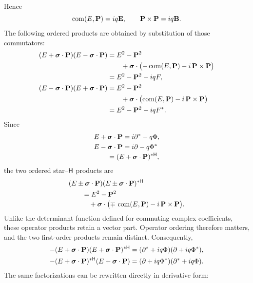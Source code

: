 Hence
\begin{equation*}
\operatorname{com}\!\left(E,\mathbf{P}\right)=iq\mathbf{E},
\qquad
\mathbf{P}\times\mathbf{P}=iq\mathbf{B}.
\end{equation*}
The following ordered products are obtained by substitution of those commutators:
\begin{align*}
(E+\mathbf{\bm{\sigma}}\cdot\mathbf{P})(E-\mathbf{\bm{\sigma}}\cdot\mathbf{P})
&=E^2-\mathbf{P}^2\notag\\
&\qquad+\mathbf{\bm{\sigma}}\cdot\bigl(-\operatorname{com}\!\left(E,\mathbf{P}\right)-i\,\mathbf{P}\times\mathbf{P}\bigr)\notag\\
&=E^2-\mathbf{P}^2-iqF,\\
(E-\mathbf{\bm{\sigma}}\cdot\mathbf{P})(E+\mathbf{\bm{\sigma}}\cdot\mathbf{P})
&=E^2-\mathbf{P}^2\notag\\
&\qquad+\mathbf{\bm{\sigma}}\cdot\bigl(\operatorname{com}\!\left(E,\mathbf{P}\right)-i\,\mathbf{P}\times\mathbf{P}\bigr)\notag\\
&=E^2-\mathbf{P}^2-iqF^{*}.
\end{align*}
Since
\begin{equation*}
\begin{aligned}
&E+\mathbf{\bm{\sigma}}\cdot\mathbf{P}
=i\partial^{*}-q\Phi,\\
&E-\mathbf{\bm{\sigma}}\cdot\mathbf{P}
=i\partial-q\Phi^{*}\\[-0.2em]
&\qquad=(E+\mathbf{\bm{\sigma}}\cdot\mathbf{P})^{*\mathsf H},
\end{aligned}
\end{equation*}
the two ordered star--\(\mathsf H\) products are
\begin{equation*}
\begin{aligned}
&(E\pm\mathbf{\bm{\sigma}}\cdot\mathbf{P})
(E\pm\mathbf{\bm{\sigma}}\cdot\mathbf{P})^{*\mathsf H}\\
&\qquad=E^2-\mathbf{P}^2\\[-0.2em]
&\qquad\quad
+\mathbf{\bm{\sigma}}\cdot\bigl(
\mp\,\operatorname{com}\!\left(E,\mathbf{P}\right)-i\,\mathbf{P}\times\mathbf{P}
\bigr).
\end{aligned}
\end{equation*}
Unlike the determinant function defined for commuting complex
coefficients, these operator products retain a vector part.  Operator ordering
therefore matters, and the two first-order products remain distinct.
Consequently,
\begin{align*}
-(E+\mathbf{\bm{\sigma}}\cdot\mathbf{P})(E+\mathbf{\bm{\sigma}}\cdot\mathbf{P})^{*\mathsf H}
&=(\partial^{*}+iq\Phi)(\partial+iq\Phi^{*}),\\
-(E+\mathbf{\bm{\sigma}}\cdot\mathbf{P})^{*\mathsf H}(E+\mathbf{\bm{\sigma}}\cdot\mathbf{P})
&=(\partial+iq\Phi^{*})(\partial^{*}+iq\Phi).
\end{align*}
The same factorizations can be rewritten directly in derivative form:
